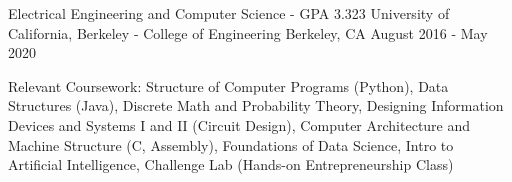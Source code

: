 \documentclass[11pt, a4paper]{awesome-cv}
\begin{document}
\makecvheader

\makecvfooter





\begin{cventries}

  \cventry
    {Electrical Engineering and Computer Science - GPA 3.323} %
    {University of California, Berkeley - College of Engineering} %
    {Berkeley, CA} %
    {August 2016 - May 2020} %
    {
      \begin{cvitems} %
        \item {Relevant Coursework: Structure of Computer Programs (Python), Data Structures (Java), Discrete Math and Probability Theory, Designing Information Devices and Systems I and II (Circuit Design), Computer Architecture and Machine Structure (C, Assembly), Foundations of Data Science, Intro to Artificial Intelligence, Challenge Lab (Hands-on Entrepreneurship Class)}
      \end{cvitems}
    }

\end{cventries}


\end{document}
